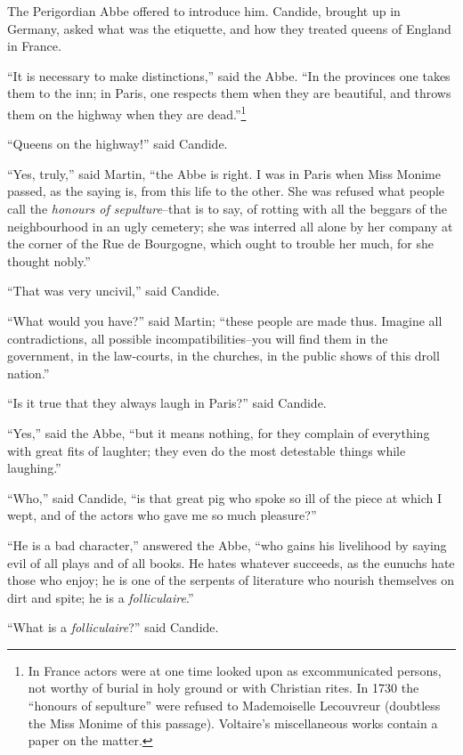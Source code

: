 The Perigordian Abbe offered to introduce him. Candide, brought up in Germany, asked what was the etiquette, and how they treated queens of England in France.

``It is necessary to make distinctions,'' said the Abbe. ``In the provinces one takes them to the inn; in Paris, one respects them when they are beautiful, and throws them on the highway when they are dead.''\footnote{In France actors were at one time looked upon as excommunicated persons, not worthy of burial in holy ground or with Christian rites. In 1730 the ``honours of sepulture'' were refused to Mademoiselle Lecouvreur (doubtless the Miss Monime of this passage). Voltaire's miscellaneous works contain a paper on the matter.}

``Queens on the highway!'' said Candide.

``Yes, truly,'' said Martin, ``the Abbe is right. I was in Paris when Miss Monime passed, as the saying is, from this life to the other. She was refused what people call the \textit{honours of sepulture}--that is to say, of rotting with all the beggars of the neighbourhood in an ugly cemetery; she was interred all alone by her company at the corner of the Rue de Bourgogne, which ought to trouble her much, for she thought nobly.''

``That was very uncivil,'' said Candide.

``What would you have?'' said Martin; ``these people are made thus. Imagine all contradictions, all possible incompatibilities--you will find them in the government, in the law-courts, in the churches, in the public shows of this droll nation.''

``Is it true that they always laugh in Paris?'' said Candide.

``Yes,'' said the Abbe, ``but it means nothing, for they complain of everything with great fits of laughter; they even do the most detestable things while laughing.''

``Who,'' said Candide, ``is that great pig who spoke so ill of the piece at which I wept, and of the actors who gave me so much pleasure?''

``He is a bad character,'' answered the Abbe, ``who gains his livelihood by saying evil of all plays and of all books. He hates whatever succeeds, as the eunuchs hate those who enjoy; he is one of the serpents of literature who nourish themselves on dirt and spite; he is a \textit{folliculaire}.''

``What is a \textit{folliculaire}?'' said Candide.

